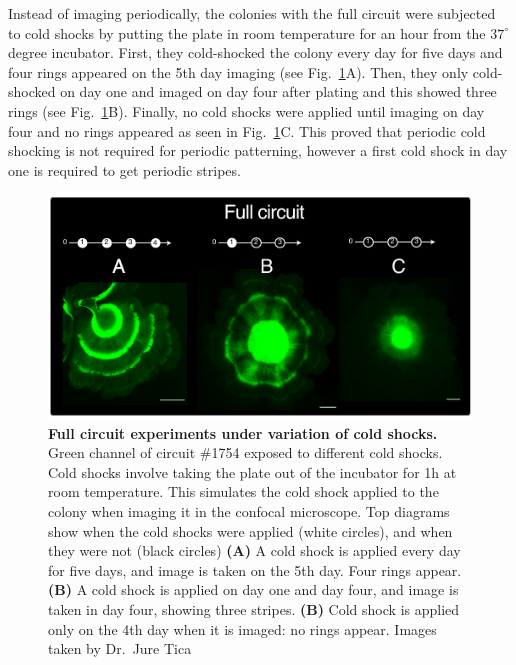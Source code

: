 Instead of imaging periodically, the colonies with the full circuit were subjected to cold shocks by putting the plate in room temperature for an hour from the $37^{\circ}$ degree incubator.
First, they cold-shocked the colony every day for five days and four rings appeared on the 5th day imaging (see Fig.~\ref{fig:cold_shock_experiments}A).
Then, they only cold-shocked on day one and imaged on day four after plating and this showed three rings (see Fig.~\ref{fig:cold_shock_experiments}B).
Finally, no cold shocks were applied until imaging on day four and no rings appeared as seen in Fig.~\ref{fig:cold_shock_experiments}C.
This proved that periodic cold shocking is not required for periodic patterning, however a first cold shock in day one is required to get periodic stripes.



\begin{figure}[H] %
    \centering
    \begin{adjustbox}{center}
        \includegraphics[width=1\textwidth]{chapters/Chapter 3/cold_shock_experiments} %
    \end{adjustbox}
    \caption{\textbf{Full circuit experiments under variation of cold shocks.} Green channel of circuit \#1754 exposed to different cold shocks. Cold shocks involve taking the plate out of the incubator for 1h at room temperature. This simulates the cold shock applied to the colony when imaging it in the confocal microscope. Top diagrams show when the cold shocks were applied (white circles), and when they were not (black circles) \textbf{(A)} A cold shock is applied every day for five days, and image is taken on the 5th day. Four rings appear. \textbf{(B)} A cold shock is applied on day one and day four, and image is taken in day four, showing three stripes.  \textbf{(B)} Cold shock is applied only on the 4th day when it is imaged: no rings appear. Images taken by Dr.~Jure Tica}
    \label{fig:cold_shock_experiments}
\end{figure}

